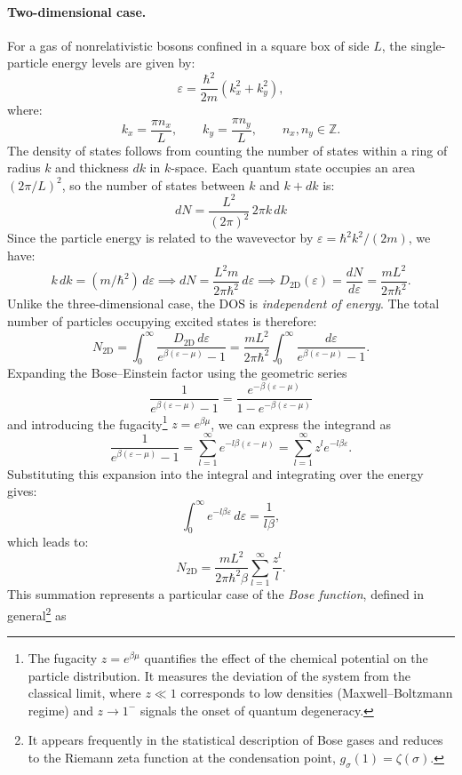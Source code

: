 \paragraph{Two-dimensional case.}
For a gas of nonrelativistic bosons confined in a square box of side \(L\), the single-particle energy levels are given by:
\[
    \varepsilon = \frac{\hbar^2}{2m}(k_x^2 + k_y^2),
\]
where: 
\[
k_x = \frac{\pi n_x}{L}, \qquad 
k_y = \frac{\pi n_y}{L}, \qquad 
n_x, n_y \in \mathbb{Z}.
\]
The density of states follows from counting the number of states within a ring of radius \(k\) and thickness \(dk\) in \(k\)-space.  
Each quantum state occupies an area \((2\pi/L)^2\), so the number of states between \(k\) and \(k+dk\) is: 
\[
  dN = \frac{L^2}{(2\pi)^2} \, 2\pi k\, dk  
\]
Since the particle energy is related to the wavevector by 
\(\varepsilon = \hbar^2 k^2 / (2m)\), we have: 
\[
    k\, dk = (m/\hbar^2)\, d\varepsilon \implies dN = \frac{L^2 m}{2\pi \hbar^2}\, d\varepsilon \implies 
D_{2\mathrm{D}}(\varepsilon) = \frac{dN}{d\varepsilon}
= \frac{mL^2}{2\pi \hbar^2}.
\]
Unlike the three-dimensional case, the DOS is \textit{independent of energy}.  
The total number of particles occupying excited states is therefore:
\[
    N_{2\mathrm{D}} = \int_0^{\infty} 
    \frac{D_{2\mathrm{D}}\, d\varepsilon}
         {e^{\beta(\varepsilon - \mu)} - 1}
    = \frac{mL^2}{2\pi \hbar^2}
      \int_0^{\infty}
      \frac{d\varepsilon}{e^{\beta(\varepsilon - \mu)} - 1}.
\]
Expanding the Bose--Einstein factor using the geometric series
\[\frac{1}{e^{\beta(\varepsilon - \mu)} - 1} 
= \frac{e^{-\beta(\varepsilon - \mu)}}{1 - e^{-\beta(\varepsilon - \mu)}}
\]
and introducing the fugacity\footnote{The fugacity \( z = e^{\beta \mu} \) quantifies the effect of the chemical potential on the particle distribution.  
It measures the deviation of the system from the classical limit, where \( z \ll 1 \) corresponds to low densities (Maxwell--Boltzmann regime) and \( z \to 1^{-} \) signals the onset of quantum degeneracy.} \( z = e^{\beta \mu} \), we can express the integrand as
\[
    \frac{1}{e^{\beta(\varepsilon - \mu)} - 1}
    = \sum_{l=1}^{\infty} e^{-l\beta(\varepsilon - \mu)}
    = \sum_{l=1}^{\infty} z^l e^{-l\beta\varepsilon}.
\]
Substituting this expansion into the integral and integrating over the energy gives:
\[
    \int_0^{\infty} e^{-l\beta\varepsilon}\, d\varepsilon = \frac{1}{l\beta},
\]
which leads to:
\[
    N_{2\mathrm{D}} = 
    \frac{mL^2}{2\pi \hbar^2 \beta}
    \sum_{l=1}^{\infty} \frac{z^l}{l}.
\]
This summation represents a particular case of the \textit{Bose function}, defined in general\footnote{%
It appears frequently in the statistical description of Bose gases and reduces to the 
Riemann zeta function at the condensation point, $g_{\sigma}(1) = \zeta(\sigma).$  
} as
